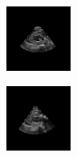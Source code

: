 \begin{figure}[htb]
        \begin{subfigure}[b]{0.245\textwidth}
                \centering
                \includegraphics[width=\linewidth]{img_seg/280_post}
        \end{subfigure}%
        \hspace{1px}
        \begin{subfigure}[b]{0.245\textwidth}
                \centering
                \includegraphics[width=\linewidth]{img_seg/282_post}

\end{subfigure}
\end{figure}

